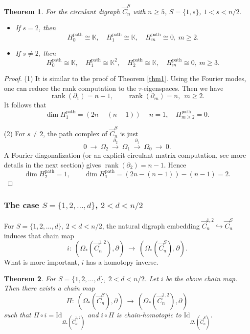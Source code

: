 \documentclass[11pt]{amsart}
\newcommand{\K}{\mathbb K}
\newcommand{\rank}{\operatorname{rank}}
\theoremstyle{plain}
\newtheorem{theorem}{Theorem}[section]
\theoremstyle{definition}
\numberwithin{equation}{section}
\begin{document}
\begin{theorem}\label{thm:1s}
For the circulant digraph $\vec{C}_n^S$ with $n\ge5$, $S=\{1,s\}$, $1<s<n/2$. 
\begin{itemize}
    \item[(1)] If $s=2$, then
    \[H_0^{\mathrm{path}}\cong\K,\quad H_1^{\mathrm{path}}\cong\K,\quad H_m^{\mathrm{path}}\cong0,~m\geq2.\]
    \item[(2)] If $s\neq2$, then
    \[H_0^{\mathrm{path}}\cong\K,\quad H_1^{\mathrm{path}}\cong\K^2,\quad H_2^{\mathrm{path}}\cong\K,\quad H_m^{\mathrm{path}}\cong0,~m\geq3.\]
\end{itemize}
\end{theorem}

\begin{proof}
(1) It is similar to the proof of Theorem \ref{thm1}. Using the Fourier modes, one can reduce the rank computation to the $\tau$-eigenspaces. Then we have
\[\rank(\partial_1)=n-1,\qquad \rank(\partial_m)=n,~~ m\geq2.\]
It follows that 
\[\dim H_1^{\mathrm{path}}=(2n-(n-1))-n=1,\quad H_{m\geq2}^{\mathrm{path}}=0.\]

(2) For $s\neq2$, the path complex of $\vec{C}_n^{S}$ is just
\[0~\rightarrow~\Omega_2~\xrightarrow{\partial_2}~\Omega_1~\xrightarrow{\partial_1}~\Omega_0~\rightarrow ~0.\]
A Fourier diagonalization (or an explicit circulant matrix computation, see more details in the next section) gives $\rank(\partial_2)=n-1$.
Hence 
\[\dim H_2^{\mathrm{path}}=1,\qquad \dim H_1^{\mathrm{path}}=(2n-(n-1))-(n-1)=2.\]
\end{proof}



\subsubsection{The case \texorpdfstring{$S=\{1,2,\ldots,d\}$, $2<d<n/2$}{S12d}} 


For $S=\{1,2,\ldots,d\}$, $2<d<n/2$, the natural digraph embedding $\vec{C}_n^{1,2}\hookrightarrow \vec{C}_n^S$ induces that chain map
\[i:\ \left(\Omega_*(\vec{C}_n^{1,2}),\partial\right)\ \to\ \left(\Omega_*(\vec{C}_n^S),\partial\right).\]
What is more important, $i$ has a homotopy inverse.

\begin{theorem}\label{thm:S12d} 
For $S=\{1,2,\ldots,d\}$, $2<d<n/2$. Let $i$ be the above chain map.
Then there exists a chain map
\[
\Pi:\ \left(\Omega_*(\vec{C}_n^S),\partial\right)~\rightarrow~ \left(\Omega_*(\vec{C}_n^{1,2}),\partial\right)
\]
such that $\Pi\circ i=\mathrm{Id}_{\Omega_*(\vec{C}_n^{1,2})}$ and $i\circ\Pi$ is chain-homotopic to $\mathrm{Id}_{\Omega_*(\vec{C}_n^S)}$.
\end{theorem}
\end{document}
